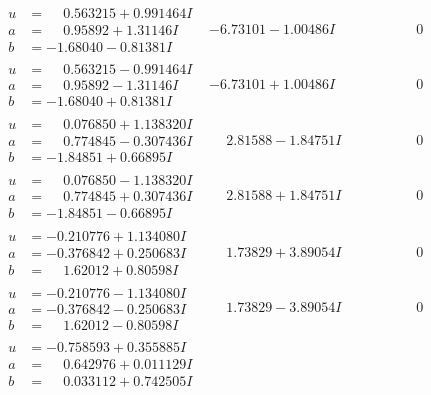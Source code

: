 \documentclass[1p]{elsarticle_modified}
\theoremstyle{definition}
\begin{document}
$$\begin{array}{c|c|c}
\begin{aligned}
u &= \phantom{-}0.563215 + 0.991464 I \\
a &= \phantom{-}0.95892 + 1.31146 I \\
b &= -1.68040 - 0.81381 I\end{aligned}
 & -6.73101 - 1.00486 I & \phantom{-0.000000 } 0 \\ \hline\begin{aligned}
u &= \phantom{-}0.563215 - 0.991464 I \\
a &= \phantom{-}0.95892 - 1.31146 I \\
b &= -1.68040 + 0.81381 I\end{aligned}
 & -6.73101 + 1.00486 I & \phantom{-0.000000 } 0 \\ \hline\begin{aligned}
u &= \phantom{-}0.076850 + 1.138320 I \\
a &= \phantom{-}0.774845 - 0.307436 I \\
b &= -1.84851 + 0.66895 I\end{aligned}
 & \phantom{-}2.81588 - 1.84751 I & \phantom{-0.000000 } 0 \\ \hline\begin{aligned}
u &= \phantom{-}0.076850 - 1.138320 I \\
a &= \phantom{-}0.774845 + 0.307436 I \\
b &= -1.84851 - 0.66895 I\end{aligned}
 & \phantom{-}2.81588 + 1.84751 I & \phantom{-0.000000 } 0 \\ \hline\begin{aligned}
u &= -0.210776 + 1.134080 I \\
a &= -0.376842 + 0.250683 I \\
b &= \phantom{-}1.62012 + 0.80598 I\end{aligned}
 & \phantom{-}1.73829 + 3.89054 I & \phantom{-0.000000 } 0 \\ \hline\begin{aligned}
u &= -0.210776 - 1.134080 I \\
a &= -0.376842 - 0.250683 I \\
b &= \phantom{-}1.62012 - 0.80598 I\end{aligned}
 & \phantom{-}1.73829 - 3.89054 I & \phantom{-0.000000 } 0 \\ \hline\begin{aligned}
u &= -0.758593 + 0.355885 I \\
a &= \phantom{-}0.642976 + 0.011129 I \\
b &= \phantom{-}0.033112 + 0.742505 I\end{aligned}

\end{array}$$
\end{document}

